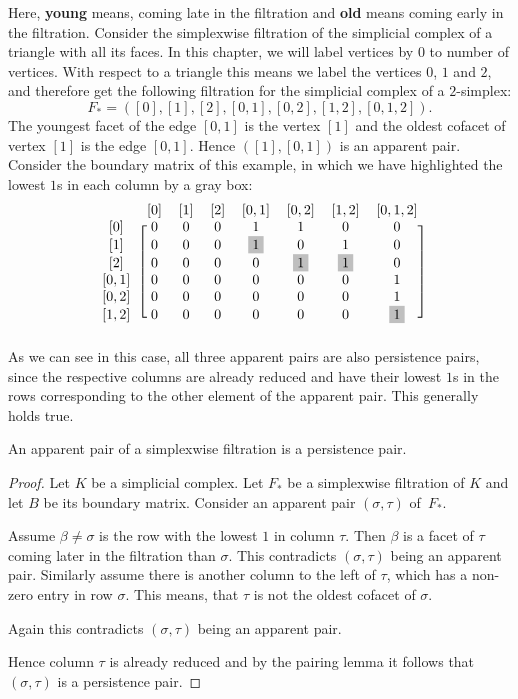 Here, \textbf{young} means, coming late in the filtration and \textbf{old} means coming early in the filtration. Consider the simplexwise filtration of the simplicial complex of a triangle with all its faces. In this chapter, we will label vertices by $0$ to number of vertices. With respect to a triangle this means we label the vertices $0$, $1$ and $2$, and therefore get the following filtration for the simplicial complex of a $2$-simplex: \[
    F_* = ([0],[1],[2],[0,1],[0,2],[1,2],[0,1,2]).
\]
The youngest facet of the edge $[0,1]$ is the vertex $[1]$ and the oldest cofacet of vertex $[1]$ is the edge $[0,1]$. Hence $([1],[0,1])$ is an apparent pair. 
Consider the boundary matrix of this example, in which we have highlighted the lowest $1$s in each column by a gray box:
\[
\begin{blockarray}{cccccccc}
& [0] & [1] & [2] & [0,1] & [0,2] & [1,2] & [0,1,2]  \\
\begin{block}{c[ccccccc]}
  [0] & 0 & 0 & 0 & 1 & 1 & 0 & 0\\*
  \left[1\right] & 0 & 0 & 0 & \colorbox{lightgray}{1} & 0 & 1 & 0\\*
  \left[2\right] & 0 & 0 & 0  & 0 & \colorbox{lightgray}{1} &\colorbox{lightgray}{1} & 0\\*
  \left[0,1\right] & 0 & 0 & 0  & 0 & 0 & 0 & 1 \\*
  \left[0,2\right] & 0 & 0 & 0  & 0 & 0 & 0 & 1\\*
  \left[1,2\right] & 0 & 0 & 0  & 0 & 0 & 0 & \colorbox{lightgray}{1}\\*
\end{block}
\end{blockarray}
\]
As we can see in this case, all three apparent pairs are also persistence pairs, since the respective columns are already reduced and have their lowest $1$s in the rows corresponding to the other element of the apparent pair. This generally holds true.
\begin{lemma}
\label{lem:app_is_pers}
An apparent pair of a simplexwise filtration is a persistence pair.
\end{lemma}
\begin{proof}
Let $K$ be a simplicial complex. Let $F_*$ be a simplexwise filtration of $K$ and let $B$ be its boundary matrix. Consider an apparent pair $(\sigma, \tau)$ of~$F_*$. 

Assume $\beta \neq \sigma$ is the row with the lowest $1$ in column $\tau$. Then $\beta$ is a facet of $\tau$ coming later in the filtration than $\sigma$. This contradicts $(\sigma, \tau)$ being an apparent pair. Similarly assume there is another column to the left of $\tau$, which has a non-zero entry in row $\sigma$. This means, that $\tau$ is not the oldest cofacet of $\sigma$. 

Again this contradicts $(\sigma, \tau)$ being an apparent pair.
 
Hence column $\tau$ is already reduced and by the pairing lemma it follows that  $(\sigma, \tau)$ is a persistence pair. 
\end{proof}

